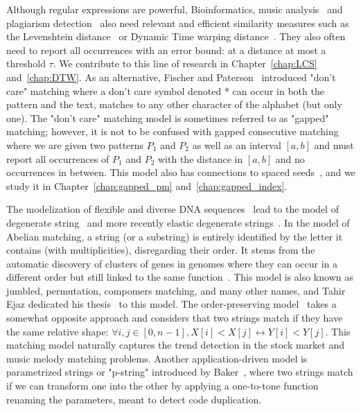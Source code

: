 Although regular expressions are powerful, Bioinformatics\cite{Gusfield1997}, music analysis~\cite{mongeau1990comparison} and plagiarism detection~\cite{lukashenko2007computer} also need relevant and efficient similarity measures such as the Levenshtein distance~\cite{levenshtein1966binary} or Dynamic Time warping distance~\cite{sakoe1978dynamic}. They also often need to report all occurrences with an error bound\cite{landau1986efficient,landau1989fast}: at a distance at most a threshold $\tau$.
We contribute to this line of research in Chapter~\ref{chap:LCS} and~\ref{chap:DTW}.
As an alternative, Fischer and Paterson~\cite{fischer1974string} introduced "don't care" matching where a don't care symbol denoted * can occur in both the pattern and the text, matches to any other character of the alphabet (but only one).
The "don't care" matching model is sometimes referred to as "gapped" matching; however, it is not to be confused with gapped consecutive matching~\cite{bille2022gapped} where we are given two patterns $P_1$ and $P_2$ as well as an interval $[a,b]$ and must report all occurrences of $P_1$ and $P_2$ with the distance in $[a,b]$ and no occurrences in between. This model also has connections to spaced seeds~\cite{burkhardt2003better}, and we study it in Chapter~\ref{chap:gapped_pm} and~\ref{chap:gapped_index}.

The modelization of flexible and diverse DNA sequences~\cite{comm1970iupac} lead to the model of degenerate string~\cite{abrahamson1987generalized} and more recently elastic degenerate strings~\cite{iliopoulos2021efficient}.
In the model of Abelian matching, a string (or a substring) is entirely identified by the letter it contains (with multiplicities), disregarding their order. It stems from the automatic discovery of clusters of genes in genomes where they can occur in a different order but still linked to the same function~\cite{eres2004permutation}. This model is also known as jumbled, permutation, compomers matching, and many other names, and Tahir Ejaz dedicated his thesis~\cite{ejaz2010abelian} to this model.
The order-preserving model~\cite{kim2014order,kubica2013linear} takes a somewhat opposite approach and considers that two strings match if they have the same relative shape: $\forall i,j \in [0,n-1], X[i] < X[j] \leftrightarrow Y[i] < Y[j]$. This matching model naturally captures the trend detection in the stock market and music melody matching problems.
%
Another application-driven model is parametrized strings or "p-string" introduced by Baker~\cite{baker1993theory}, where two strings match if we can transform one into the other by applying a one-to-tone function renaming the parameters, meant to detect code duplication.\\


